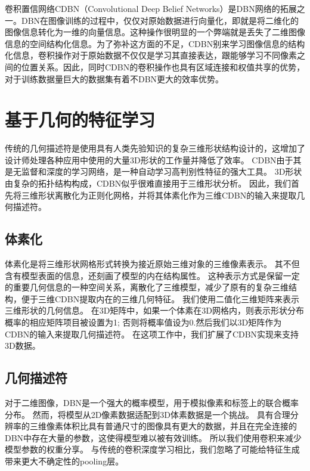 卷积置信网络CDBN（Convolutional Deep Belief Networks）是DBN网络的拓展之一。DBN在图像训练的过程中，仅仅对原始数据进行向量化，即就是将二维化的图像信息转化为一维的向量信息。这种操作很明显的一个弊端就是丢失了二维图像信息的空间结构化信息。为了弥补这方面的不足，CDBN别来学习图像信息的结构化信息，卷积操作对于原始数据不仅仅是学习其直接表达，跟能够学习不同像素之间的位置关系。因此，同时CDBN的卷积操作也具有区域连接和权值共享的优势，对于训练数据量巨大的数据集有着不DBN更大的效率优势。





\section{基于几何的特征学习}
传统的几何描述符是使用具有人类先验知识的复杂三维形状结构设计的，这增加了设计师处理各种应用中使用的大量3D形状的工作量并降低了效率。 CDBN由于其是无监督和深度的学习网络，是一种自动学习高判别性特征的强大工具。 3D形状由复杂的拓扑结构构成，CDBN似乎很难直接用于三维形状分析。 因此，我们首先将三维形状离散化为正则化网格，并将其体素化作为三维CDBN的输入来提取几何描述符。

\subsection{体素化}
体素化是将三维形状网格形式转换为接近原始三维对象的三维像素表示。 其不但含有模型表面的信息，还刻画了模型的内在结构属性。 这种表示方式是保留一定的重要几何信息的一种空间关系，离散化了三维模型，减少了原有的复杂三维结构，便于三维CDBN提取内在的三维几何特征。 我们使用二值化三维矩阵来表示三维形状的几何信息。 在3D矩阵中，如果一个体素在3D网格内，则表示形状分布概率的相应矩阵项目被设置为1; 否则将概率值设为0.然后我们以3D矩阵作为CDBN的输入来提取几何描述符。 在这项工作中，我们扩展了CDBN实现来支持3D数据。

\subsection{几何描述符}
对于二维图像，DBN\cite{Hinton2006A}是一个强大的概率模型，用于模拟像素和标签上的联合概率分布。 然而，将模型从2D像素数据适配到3D体素数据是一个挑战。 具有合理分辨率的三维像素体积比具有普通尺寸的图像具有更大的数据，并且在完全连接的DBN中存在大量的参数，这使得模型难以被有效训练。 所以我们使用卷积来减少模型参数的权重分享。 与传统的卷积深度学习相比，我们忽略了可能给特征生成带来更大不确定性的pooling层。

